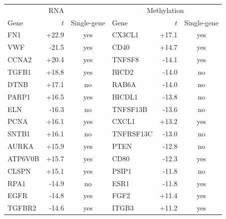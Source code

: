 \begin{tabular}{lrc|lrc}
\toprule
\multicolumn{3}{c|}{RNA} & \multicolumn{3}{c}{Methylation} \\
Gene & $t$ & Single-gene & Gene & $t$ & Single-gene \\
\midrule
FN1 & +22.9 & yes & CX3CL1 & +17.1 & yes \\
VWF & -21.5 & yes & CD40 & +14.7 & yes \\
CCNA2 & +20.4 & yes & TNFSF8 & -14.1 & yes \\
TGFB1 & +18.8 & yes & BICD2 & -14.0 & no \\
DTNB & +17.1 & no & RAB6A & -14.0 & no \\
PARP1 & +16.5 & yes & BICDL1 & -13.8 & no \\
ELN & -16.3 & no & TNFSF13B & -13.6 & no \\
PCNA & +16.1 & yes & CXCL1 & +13.2 & yes \\
SNTB1 & +16.1 & no & TNFRSF13C & -13.0 & no \\
AURKA & +15.9 & yes & PTEN & -12.8 & no \\
ATP6V0B & +15.7 & yes & CD80 & -12.3 & yes \\
CLSPN & +15.1 & yes & PSIP1 & -11.8 & no \\
RPA1 & -14.9 & no & ESR1 & -11.8 & yes \\
EGFR & -14.8 & yes & FGF2 & +11.4 & yes \\
TGFBR2 & -14.6 & yes & ITGB3 & +11.2 & yes \\
\bottomrule
\end{tabular}
